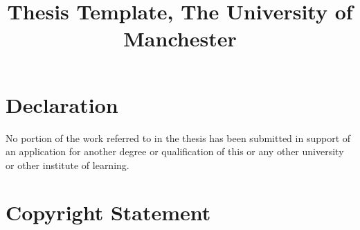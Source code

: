 \documentclass[11pt,oneside]{thesisformat}
\title{Thesis Template, The University of Manchester}
\begin{document}
\maketitle
\addtocounter{page}{1}

\tableofcontents
\vfill
\begin{center}
\end{center}
\vfill

\listoftables


\listoffigures




\chapter*{Declaration}

No portion of the work referred to in the thesis has been submitted in support of an application for another degree or qualification of this or any other university or other institute of learning.


\chapter*{Copyright Statement}
\end{document}
